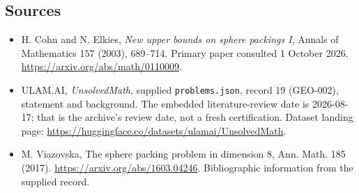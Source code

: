 \documentclass[11pt,a4paper]{article}
\begin{document}
\subsection{Sources}

{\small

\begin{itemize}
\item[E1] H. Cohn and N. Elkies, \emph{New upper bounds on sphere packings I}, Annals of Mathematics 157 (2003), 689--714. Primary paper consulted 1 October 2026. \url{https://arxiv.org/abs/math/0110009}.


\item[\hypertarget{source:19:1}{S1}] ULAM.AI, \emph{UnsolvedMath}, supplied \texttt{problems.json}, record 19 (GEO-002), statement and background. The embedded literature-review date is 2026-08-17; that is the archive’s review date, not a fresh certification. Dataset landing page: \url{https://huggingface.co/datasets/ulamai/UnsolvedMath}.

\item[\hypertarget{source:19:2}{S2}] M. Viazovska, The sphere packing problem in dimension 8, Ann. Math. 185 (2017). \url{https://arxiv.org/abs/1603.04246}. Bibliographic information from the supplied record.

\end{itemize}

}

\label{end:19}
\end{document}

